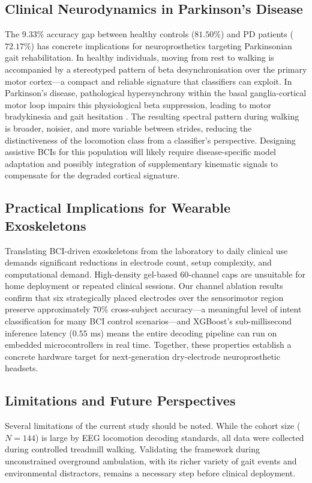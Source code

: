 \documentclass[11pt,a4paper]{article}
\begin{document}
\subsection{Clinical Neurodynamics in Parkinson's Disease}
The $9.33\%$ accuracy gap between healthy controls ($81.50\%$) and PD patients ($72.17\%$) has concrete implications for neuroprosthetics targeting Parkinsonian gait rehabilitation. In healthy individuals, moving from rest to walking is accompanied by a stereotyped pattern of beta desynchronisation over the primary motor cortex---a compact and reliable signature that classifiers can exploit. In Parkinson's disease, pathological hypersynchrony within the basal ganglia-cortical motor loop impairs this physiological beta suppression, leading to motor bradykinesia and gait hesitation \cite{orban2024dataset, gilat2021locomotion}. The resulting spectral pattern during walking is broader, noisier, and more variable between strides, reducing the distinctiveness of the locomotion class from a classifier's perspective. Designing assistive BCIs for this population will likely require disease-specific model adaptation and possibly integration of supplementary kinematic signals to compensate for the degraded cortical signature.

\subsection{Practical Implications for Wearable Exoskeletons}
Translating BCI-driven exoskeletons from the laboratory to daily clinical use demands significant reductions in electrode count, setup complexity, and computational demand. High-density gel-based 60-channel caps are unsuitable for home deployment or repeated clinical sessions. Our channel ablation results confirm that six strategically placed electrodes over the sensorimotor region preserve approximately $70\%$ cross-subject accuracy---a meaningful level of intent classification for many BCI control scenarios---and XGBoost's sub-millisecond inference latency ($0.55\text{ ms}$) means the entire decoding pipeline can run on embedded microcontrollers in real time. Together, these properties establish a concrete hardware target for next-generation dry-electrode neuroprosthetic headsets.

\subsection{Limitations and Future Perspectives}
Several limitations of the current study should be noted. While the cohort size ($N=144$) is large by EEG locomotion decoding standards, all data were collected during controlled treadmill walking. Validating the framework during unconstrained overground ambulation, with its richer variety of gait events and environmental distractors, remains a necessary step before clinical deployment.
\end{document}
